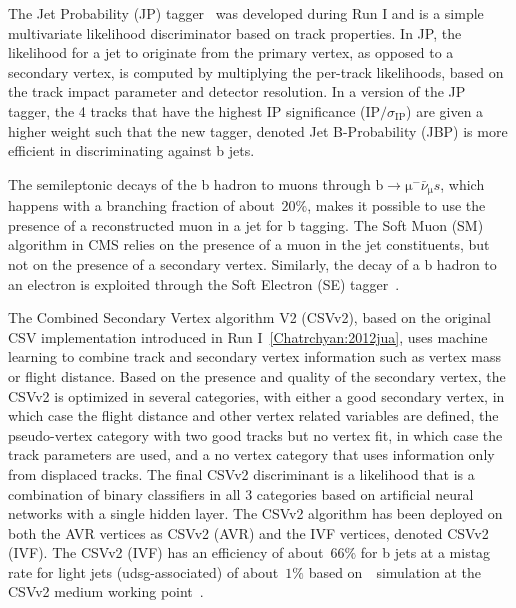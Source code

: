 The Jet Probability (JP) tagger~\cite{Chatrchyan:2012jua} was developed during Run I and is a simple multivariate likelihood discriminator based on track properties. In JP, the likelihood for a jet to originate from the primary vertex, as opposed to a secondary vertex, is computed by multiplying the per-track likelihoods, based on the track impact parameter and detector resolution. In a version of the JP tagger, the 4 tracks that have the highest IP significance ($\mathrm{IP} / \sigma_{\mathrm{IP}}$) are given a higher weight such that the new tagger, denoted Jet B-Probability (JBP) is more efficient in discriminating against b jets.

The semileptonic decays of the b hadron to muons through $\mathrm{b} \rightarrow \mathrm{\mu}^- \bar{\nu}_{\mathrm{\mu}} s$, which happens with a branching fraction of about~$20\%$, makes it possible to use the presence of a reconstructed muon in a jet for b tagging. The Soft Muon (SM) algorithm in CMS relies on the presence of a muon in the jet constituents, but not on the presence of a secondary vertex. Similarly, the decay of a b hadron to an electron is exploited through the Soft Electron (SE) tagger~\cite{CMS-PAS-BTV-15-001}. 

The Combined Secondary Vertex algorithm V2 (CSVv2), based on the original CSV implementation introduced in Run I~\cref{Chatrchyan:2012jua}, uses machine learning to combine track and secondary vertex information such as vertex mass or flight distance. Based on the presence and quality of the secondary vertex, the CSVv2 is optimized in several categories, with either a good secondary vertex, in which case the flight distance and other vertex related variables are defined, the pseudo-vertex category with two good tracks but no vertex fit, in which case the track parameters are used, and a no vertex category that uses information only from displaced tracks. The final CSVv2 discriminant is a likelihood that is a combination of binary classifiers in all 3 categories based on artificial neural networks with a single hidden layer. The CSVv2 algorithm has been deployed on both the AVR vertices as CSVv2 (AVR) and the IVF vertices, denoted CSVv2 (IVF). The CSVv2 (IVF) has an efficiency of about~$66\%$ for b jets at a mistag rate for light jets (udsg-associated) of about~$1\%$ based on~\ttbar~simulation at the CSVv2 medium working point~\cite{CMS-PAS-BTV-15-001}.


